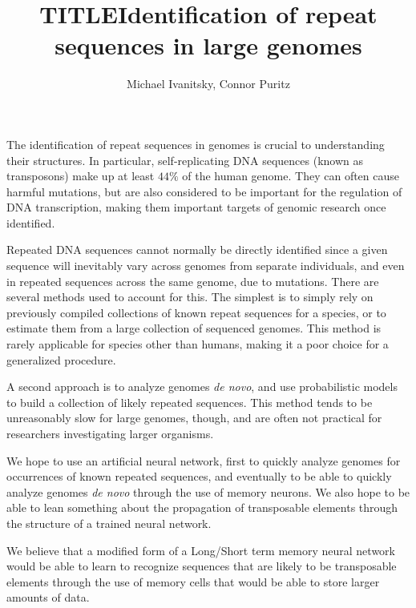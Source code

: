 \documentclass{article}
\date{}
\title{TITLE}
\author{Michael Ivanitsky, Connor Puritz}
\title{Identification of repeat sequences in large genomes}
\begin{document}
\maketitle
The identification of repeat sequences in genomes is crucial to understanding their structures. In particular, self-replicating DNA sequences (known as transposons) make up at least $44\%$ of the human genome. They can often cause harmful mutations, but are also considered to be important for the regulation of DNA transcription, making them important targets of genomic research once identified.

Repeated DNA sequences cannot normally be directly identified since a given sequence will inevitably vary across genomes from separate individuals, and even in repeated sequences across the same genome, due to mutations. There are several methods used to account for this. The simplest is to simply rely on previously compiled collections of known repeat sequences for a species, or to estimate them from a large collection of sequenced genomes. This method is rarely applicable for species other than humans, making it a poor choice for a generalized procedure.

A second approach is to analyze genomes \textit{de novo}, and use probabilistic models to build a collection of likely repeated sequences. This method tends to be unreasonably slow for large genomes, though, and are often not practical for researchers investigating larger organisms.

We hope to use an artificial neural network, first to quickly analyze genomes for occurrences of known repeated sequences, and eventually to be able to quickly analyze genomes \textit{de novo} through the use of memory neurons. We also hope to be able to lean something about the propagation of transposable elements through the structure of a trained neural network.

We believe that a modified form of a Long/Short term memory neural network would be able to learn to recognize sequences that are likely to be transposable elements through the use of memory cells that would be able to store larger amounts of data.
\end{document}
